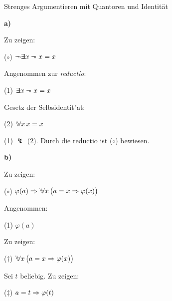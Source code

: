\documentclass[a4paper,12pt]{scrartcl}
\newcommand{\Ex}{\Exists}
\begin{document}
 
\header

\begin{task}{Strenges Argumentieren mit Quantoren und Identität}

\textbf{a) }
\vspace{4pt}

Zu zeigen:

\vspace{2pt}
($\circ$) \hspace*{1em} $\Neg \Ex x \, \Neg \ x = x$

\vspace{2pt}
Angenommen zur \emph{reductio}: 

\vspace{2pt}
(1) \hspace*{1em} $\Ex x \, \Neg \ x = x$

\vspace{2pt}
Gesetz der Selbsidentit"at:

\vspace{2pt}
(2) \hspace*{1em} $\Forall x \, x = x$

\vspace{10pt}
(1) $\lightning$ (2). Durch die reductio ist ($\circ$) bewiesen.
\vspace{15pt}

\textbf{b) }
\vspace{4pt}

Zu zeigen:

\vspace{2pt}
($\circ$) \hspace*{1em} $\varphi(a) \Then \Forall x \, \big(a=x \Then \varphi(x)\big)$

\vspace{2pt}
Angenommen: 

\vspace{2pt}
(1) \hspace*{1em} $\varphi(a)$

\vspace{2pt}
Zu zeigen:

\vspace{2pt}
($\dagger$) \hspace*{1em} $\Forall x \, \big(a=x \Then \varphi(x)\big)$

\vspace{2pt}
Sei $t$ beliebig. Zu zeigen: 

\vspace{2pt}
($\ddagger$) \hspace*{1em} $a=t \Rightarrow \varphi(t)$


\end{task}
\end{document}
